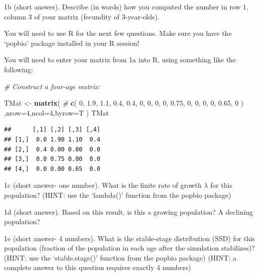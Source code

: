 \documentclass[
]{article}
\newenvironment{Shaded}{\begin{snugshade}}{\end{snugshade}}
\newcommand{\AttributeTok}[1]{\textcolor[rgb]{0.13,0.29,0.53}{#1}}
\newcommand{\CommentTok}[1]{\textcolor[rgb]{0.56,0.35,0.01}{\textit{#1}}}
\newcommand{\DecValTok}[1]{\textcolor[rgb]{0.00,0.00,0.81}{#1}}
\newcommand{\FloatTok}[1]{\textcolor[rgb]{0.00,0.00,0.81}{#1}}
\newcommand{\FunctionTok}[1]{\textcolor[rgb]{0.13,0.29,0.53}{\textbf{#1}}}
\newcommand{\NormalTok}[1]{#1}
\newcommand{\OtherTok}[1]{\textcolor[rgb]{0.56,0.35,0.01}{#1}}
\begin{document}
1b (short answer). Describe (in words) how you computed the number in
row 1, column 3 of your matrix (fecundity of 3-year-olds).

You will need to use R for the next few questions. Make sure you have
the `popbio' package installed in your R session!

You will need to enter your matrix from 1a into R, using something like
the following:

\begin{Shaded}
\begin{Highlighting}[]
\CommentTok{\# Construct a four{-}age matrix:}

\NormalTok{TMat }\OtherTok{\textless{}{-}} \FunctionTok{matrix}\NormalTok{(     }\CommentTok{\# }
  \FunctionTok{c}\NormalTok{(}
    \DecValTok{0}\NormalTok{,     }\FloatTok{1.9}\NormalTok{,   }\FloatTok{1.1}\NormalTok{,    }\FloatTok{0.4}\NormalTok{,   }
    \FloatTok{0.4}\NormalTok{,     }\DecValTok{0}\NormalTok{,     }\DecValTok{0}\NormalTok{,      }\DecValTok{0}\NormalTok{,    }
    \DecValTok{0}\NormalTok{,       }\FloatTok{0.75}\NormalTok{,  }\DecValTok{0}\NormalTok{,      }\DecValTok{0}\NormalTok{,   }
    \DecValTok{0}\NormalTok{,       }\DecValTok{0}\NormalTok{,     }\FloatTok{0.65}\NormalTok{,   }\DecValTok{0}  
\NormalTok{  )}
\NormalTok{  ,}\AttributeTok{nrow=}\DecValTok{4}\NormalTok{,}\AttributeTok{ncol=}\DecValTok{4}\NormalTok{,}\AttributeTok{byrow=}\NormalTok{T}
\NormalTok{)}
\NormalTok{TMat}
\end{Highlighting}
\end{Shaded}

\begin{verbatim}
##      [,1] [,2] [,3] [,4]
## [1,]  0.0 1.90 1.10  0.4
## [2,]  0.4 0.00 0.00  0.0
## [3,]  0.0 0.75 0.00  0.0
## [4,]  0.0 0.00 0.65  0.0
\end{verbatim}

1c (short answer- one number). What is the finite rate of growth
\(\lambda\) for this population? (HINT: use the `lambda()' function from
the popbio package)

1d (short answer). Based on this result, is this a growing population? A
declining population?

1e (short answer- 4 numbers). What is the stable-stage distribution
(SSD) for this population (fraction of the population in each age after
the simulation stabilizes)? (HINT: use the `stable.stage()' function
from the popbio package) (HINT: a complete answer to this question
requires exactly 4 numbers)
\end{document}
